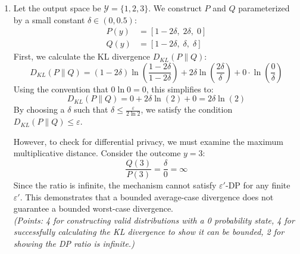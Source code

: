 \documentclass[12pt]{article}
\begin{document}
\begin{enumerate}
\begin{solution}
\begin{enumerate}
\item
Let the output space be $\mathcal{Y} = \{1, 2, 3\}$. We construct $P$ and $Q$ parameterized by a small constant $\delta \in (0, 0.5)$:
\begin{align*}
    P(y) &= [1 - 2\delta,\; 2\delta,\; 0] \\
    Q(y) &= [1 - 2\delta,\; \delta,\; \delta]
\end{align*}
First, we calculate the KL divergence $D_{KL}(P \parallel Q)$:
\[
D_{KL}(P \parallel Q) = (1-2\delta) \ln\left(\frac{1-2\delta}{1-2\delta}\right) + 2\delta \ln\left(\frac{2\delta}{\delta}\right) + 0 \cdot \ln\left(\frac{0}{\delta}\right)
\]
Using the convention that $0 \ln 0 = 0$, this simplifies to:
\[
D_{KL}(P \parallel Q) = 0 + 2\delta \ln(2) + 0 = 2\delta \ln(2)
\]
By choosing a $\delta$ such that $\delta \le \frac{\varepsilon}{2 \ln 2}$, we satisfy the condition $D_{KL}(P \parallel Q) \le \varepsilon$. 

However, to check for differential privacy, we must examine the maximum multiplicative distance. Consider the outcome $y = 3$:
\[
\frac{Q(3)}{P(3)} = \frac{\delta}{0} = \infty
\]
Since the ratio is infinite, the mechanism cannot satisfy $\varepsilon'$-DP for any finite $\varepsilon'$. This demonstrates that a bounded average-case divergence does not guarantee a bounded worst-case divergence. \\
\textit{(Points: 4 for constructing valid distributions with a 0 probability state, 4 for successfully calculating the KL divergence to show it can be bounded, 2 for showing the DP ratio is infinite.)}



\end{enumerate}
\end{solution}
\end{enumerate}
\end{document}
